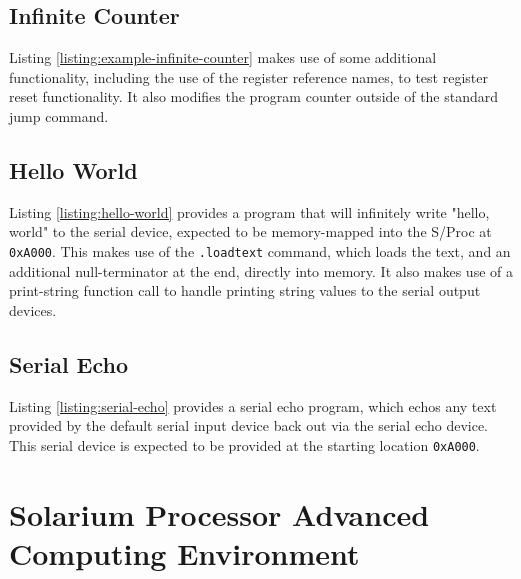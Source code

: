 \documentclass{article}
\begin{document}


\subsection{Infinite Counter}

Listing \ref{listing:example-infinite-counter} makes use of some additional functionality, including the use of the register reference names, to test register reset functionality. It also modifies the program counter outside of the standard jump command.



\subsection{Hello World}

Listing  \ref{listing:hello-world} provides a program that will infinitely write "hello, world" to the serial device, expected to be memory-mapped into the S/Proc at \texttt{0xA000}. This makes use of the \texttt{.loadtext} command, which loads the text, and an additional null-terminator at the end, directly into memory. It also makes use of a print-string function call to handle printing string values to the serial output devices.



\pagebreak

\subsection{Serial Echo}

Listing \ref{listing:serial-echo} provides a serial echo program, which echos any text provided by the default serial input device back out via the serial echo device. This serial device is expected to be provided at the starting location \texttt{0xA000}.



\pagebreak

\section{Solarium Processor Advanced Computing Environment}
\end{document}

